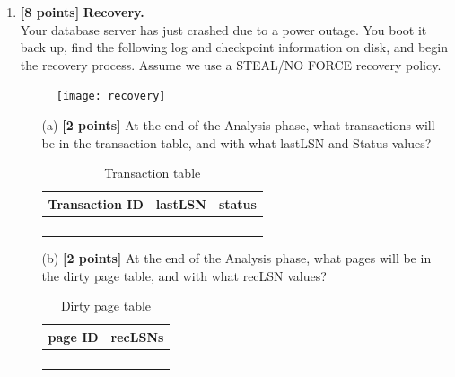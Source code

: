 \documentclass[10pt]{article}
\begin{document}
\begin{enumerate}
	\item \textbf{[8 points]} \textbf{Recovery.} \\
	      Your database server has just crashed due to a power outage.
	      You boot it back up, find the following log and checkpoint information on disk,
	      and begin the recovery process. Assume we use a STEAL/NO FORCE recovery policy.
	      \begin{figure}[h]
		      \centering
		      \texttt{[image: recovery]}
		      \label{fig:recovery}
	      \end{figure}
	      \begin{itemize}
		      \item[(a)] \textbf{[2 points]}
		            At the end of the Analysis phase, what transactions will be in the transaction table,
		            and with what lastLSN and Status values?
		            \begin{table}[h]
			            \centering
			            \begin{tabular}{|c|c|c|}
				            \hline
				            Transaction ID & lastLSN & status \\
				            \hline
				                           &         &        \\
				            \hline
				                           &         &        \\
				            \hline
				                           &         &        \\
				            \hline
				                           &         &        \\
				            \hline
			            \end{tabular}
			            \caption{Transaction table}
		            \end{table}
		      \item[(b)] \textbf{[2 points]}
		            At the end of the Analysis phase, what pages will be in the dirty page table, and with what recLSN values?
		            \begin{table}[h]
			            \centering
			            \begin{tabular}{|c|c|}
				            \hline
				            page ID & recLSNs \\
				            \hline
				                    &         \\
				            \hline
				                    &         \\
				            \hline
				                    &         \\
				            \hline
				                    &         \\
				            \hline
			            \end{tabular}
			            \caption{Dirty page table}
		            \end{table}


\end{itemize}
\end{enumerate}
\end{document}
